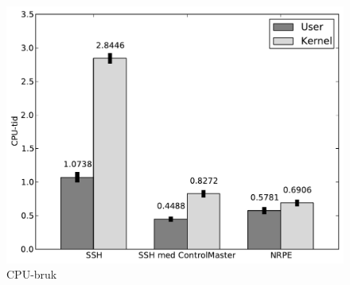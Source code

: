 \begin{figure}[H]
    \centering
    \includegraphics[scale=0.6]{img/cpubruk}
    \caption{CPU-bruk}
    \label{cpu_usage}
\end{figure}

